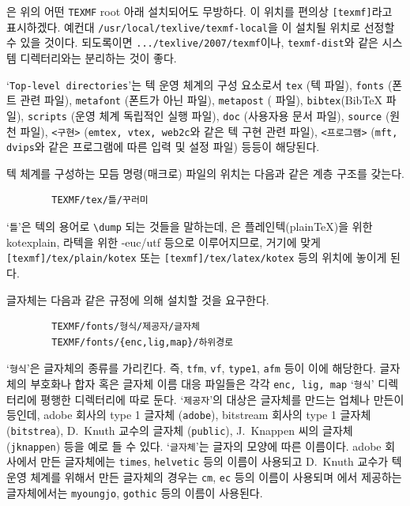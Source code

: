 \kotex 은 위의 어떤 \texttt{TEXMF} root 아래 설치되어도 무방하다.
이 위치를 편의상 \texttt{[texmf]}라고 표시하겠다. 
예컨대 \texttt{/usr/local/texlive/texmf-local}을 \kotex 이
설치될 위치로 선정할 수 있을 것이다. 되도록이면 \texttt{.../texlive/2007/texmf}이나, \texttt{texmf-dist}와 같은 시스템 디렉터리와는 분리하는 것이
좋다. 

`\texttt{Top-level directories}'는 텍 운영 체계의 구성 요소로서 \texttt{tex} (텍
파일), \texttt{fonts} (폰트 관련 파일), \texttt{metafont} (폰트가 아닌
\MF{} 파일), \texttt{metapost} (\MP{} 파일), \texttt{bibtex}(Bib\TeX{}
파일), \texttt{scripts} (운영 체계 독립적인 실행 파일), \texttt{doc}
(사용자용 문서 파일), \texttt{source} (원천 파일), \texttt{<구현>}
(\texttt{emtex, vtex, web2c}와 같은 텍 구현 관련 파일),
\texttt{<프로그램>} (\texttt{mft, dvips}와 같은 프로그램에 따른 입력 및
설정 파일) 등등이 해당된다.

텍 체계를 구성하는 모듬 명령(매크로) 파일의 위치는 다음과 같은 계층 구조를
갖는다.
\begin{verbatim}
        TEXMF/tex/틀/꾸러미
\end{verbatim}

`\texttt{틀}'은 텍의 용어로 \verb|\dump| 되는 것들을 말하는데,
\kotex 은 플레인텍(plain\-\TeX)을 위한 kotexplain, 라텍을 위한 \kotex-euc/utf
등으로 이루어지므로, 거기에 맞게 \texttt{[texmf]/tex/plain/kotex} 
또는 \texttt{[texmf]/tex/latex/kotex} 등의 위치에 놓이게 된다.

글자체는 다음과 같은 규정에 의해 설치할 것을 요구한다.
\begin{verbatim}
        TEXMF/fonts/형식/제공자/글자체
        TEXMF/fonts/{enc,lig,map}/하위경로
\end{verbatim}
`\texttt{형식}'은 글자체의 종류를 가리킨다.  즉, 
\texttt{tfm}, \texttt{vf}, \texttt{type1},
\texttt{afm} 등이 이에 해당한다.  글자체의 부호화나 합자 혹은 글자체
이름 대응 파일들은 각각 \texttt{enc, lig, map} `\texttt{형식}' 디렉터리에
평행한 디렉터리에 따로 둔다.  `\texttt{제공자}'의 대상은 글자체를
만드는 업체나 만든이 등인데,  adobe 회사의 type 1 글자체
(\texttt{adobe}), bitstream 회사의 type 1 글자체 (\texttt{bitstrea}),
D.~Knuth 교수의 \MF{} 글자체 (\texttt{public}), J.~Knappen 씨의 \MF{}
글자체 (\texttt{jknappen}) 등을 예로 들 수 있다.
`\texttt{글자체}'는 글자의
모양에 따른 이름이다.  adobe 회사에서 만든 글자체에는
\texttt{times}, \texttt{helvetic} 등의 이름이 사용되고 D.~Knuth 교수가
텍 운영 체계를 위해서 만든 글자체의 경우는 \texttt{cm}, \texttt{ec}
등의 이름이 사용되며 \kotex 에서 제공하는 글자체에서는
\texttt{myoungjo}, \texttt{gothic} 등의 이름이 사용된다.

